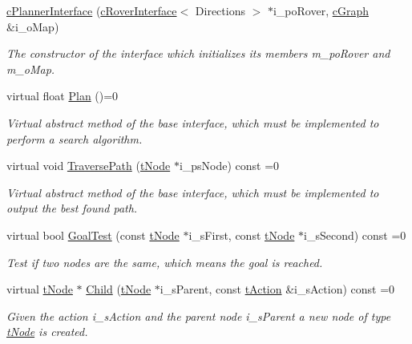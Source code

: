 \begin{DoxyCompactItemize}
\item 
\mbox{\label{classplanner_1_1c_planner_interface_aa3c1b1467ed9cc94fb293339c04924d1}} 
\mbox{\hyperlink{classplanner_1_1c_planner_interface_aa3c1b1467ed9cc94fb293339c04924d1}{c\+Planner\+Interface}} (\mbox{\hyperlink{classplanner_1_1c_rover_interface}{c\+Rover\+Interface}}$<$ Directions $>$ $\ast$i\+\_\+po\+Rover, \mbox{\hyperlink{classplanner_1_1c_graph}{c\+Graph}} \&i\+\_\+o\+Map)
\begin{DoxyCompactList}\small\item\em The constructor of the interface which initializes its members m\+\_\+po\+Rover and m\+\_\+o\+Map. \end{DoxyCompactList}\item 
virtual float \mbox{\hyperlink{classplanner_1_1c_planner_interface_a4d8effce5ee5d097a30465280e9416d6}{Plan}} ()=0
\begin{DoxyCompactList}\small\item\em Virtual abstract method of the base interface, which must be implemented to perform a search algorithm. \end{DoxyCompactList}\item 
virtual void \mbox{\hyperlink{classplanner_1_1c_planner_interface_a5c30b547b681b04434102fbcc7c72ea3}{Traverse\+Path}} (\mbox{\hyperlink{structplanner_1_1t_node}{t\+Node}} $\ast$i\+\_\+ps\+Node) const =0
\begin{DoxyCompactList}\small\item\em Virtual abstract method of the base interface, which must be implemented to output the best found path. \end{DoxyCompactList}\item 
virtual bool \mbox{\hyperlink{classplanner_1_1c_planner_interface_aadc6ccb9088f755bd0ec30046bb79e99}{Goal\+Test}} (const \mbox{\hyperlink{structplanner_1_1t_node}{t\+Node}} $\ast$i\+\_\+s\+First, const \mbox{\hyperlink{structplanner_1_1t_node}{t\+Node}} $\ast$i\+\_\+s\+Second) const =0
\begin{DoxyCompactList}\small\item\em Test if two nodes are the same, which means the goal is reached. \end{DoxyCompactList}\item 
virtual \mbox{\hyperlink{structplanner_1_1t_node}{t\+Node}} $\ast$ \mbox{\hyperlink{classplanner_1_1c_planner_interface_a499d8d3b81b0090318f4f2ea044c084c}{Child}} (\mbox{\hyperlink{structplanner_1_1t_node}{t\+Node}} $\ast$i\+\_\+s\+Parent, const \mbox{\hyperlink{structplanner_1_1t_action}{t\+Action}} \&i\+\_\+s\+Action) const =0
\begin{DoxyCompactList}\small\item\em Given the action i\+\_\+s\+Action and the parent node i\+\_\+s\+Parent a new node of type \mbox{\hyperlink{structplanner_1_1t_node}{t\+Node}} is created. \end{DoxyCompactList}\end{DoxyCompactItemize}
